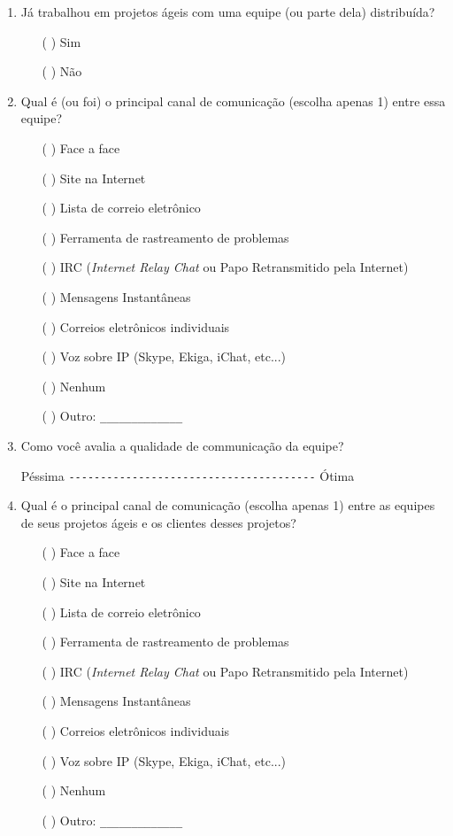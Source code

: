 \begin{enumerate}
\item Já trabalhou em projetos ágeis com uma equipe (ou parte dela)
  distribuída?
  \begin{itemize}
  \item[( )] Sim
  \item[( )] Não
  \end{itemize}

\item Qual é (ou foi) o principal canal de comunicação (escolha apenas
  1) entre essa equipe?
  \begin{itemize}
  \item[( )] Face a face
  \item[( )] Site na Internet
  \item[( )] Lista de correio eletrônico
  \item[( )] Ferramenta de rastreamento de problemas
  \item[( )] IRC (\textit{Internet Relay Chat} ou Papo Retransmitido
    pela Internet)
  \item[( )] Mensagens Instantâneas
  \item[( )] Correios eletrônicos individuais
  \item[( )] Voz sobre IP (Skype, Ekiga, iChat, etc...)
  \item[( )] Nenhum
  \item[( )] Outro: \verb=_____________=
  \end{itemize}

\item Como você avalia a qualidade de communicação da equipe?

  Péssima \verb=---------------------------------------= Ótima

\item Qual é o principal canal de comunicação (escolha apenas 1) entre
  as equipes de seus projetos ágeis e os clientes desses projetos?
  \begin{itemize}
  \item[( )] Face a face
  \item[( )] Site na Internet
  \item[( )] Lista de correio eletrônico
  \item[( )] Ferramenta de rastreamento de problemas
  \item[( )] IRC (\textit{Internet Relay Chat} ou Papo Retransmitido
    pela Internet)
  \item[( )] Mensagens Instantâneas
  \item[( )] Correios eletrônicos individuais
  \item[( )] Voz sobre IP (Skype, Ekiga, iChat, etc...)
  \item[( )] Nenhum
  \item[( )] Outro: \verb=_____________=
  \end{itemize}


\end{enumerate}
